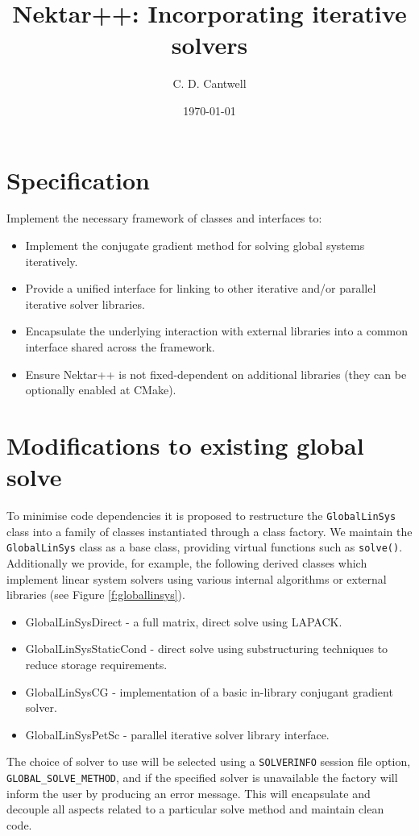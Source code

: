 \documentclass{article}
\title{Nektar++: Incorporating iterative solvers}
\author{C. D. Cantwell}
\date{\today}
\begin{document}
\maketitle


\section{Specification}
Implement the necessary framework of classes and interfaces to:
\begin{itemize}
  \item Implement the conjugate gradient method for solving global systems
  iteratively.
  \item Provide a unified interface for linking to other iterative
  and/or parallel iterative solver libraries.
  \item Encapsulate the underlying interaction with external libraries into a
  common interface shared across the framework.
  \item Ensure Nektar++ is not fixed-dependent on additional libraries (they
  can be optionally enabled at CMake).
\end{itemize}

\section{Modifications to existing global solve}
To minimise code dependencies it is proposed to restructure the
\texttt{GlobalLinSys} class into a family of classes instantiated through a
class factory. We maintain the \texttt{GlobalLinSys} class as a base class, providing
virtual functions such as \texttt{solve()}. Additionally we provide,
for example, the following derived classes which implement linear system solvers
using various internal algorithms or external libraries (see Figure
\ref{f:globallinsys}).
\begin{itemize}
    \item GlobalLinSysDirect - a full matrix, direct solve using LAPACK.
    \item GlobalLinSysStaticCond - direct solve using substructuring
    techniques to reduce storage requirements.
    \item GlobalLinSysCG - implementation of a basic in-library conjugant
    gradient solver.
    \item GlobalLinSysPetSc - parallel iterative solver library interface.
\end{itemize}
The choice of solver to use will be selected using a \texttt{SOLVERINFO}
session file option, \texttt{GLOBAL\_SOLVE\_METHOD}, and if the specified
solver is unavailable the factory will inform the user by producing an error
message. This will encapsulate and decouple all aspects related to a
particular solve method and maintain clean code.
\end{document}
